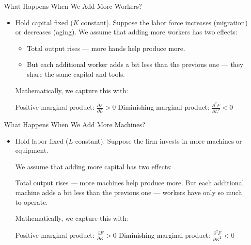 \documentclass[10pt,aspectratio=169]{beamer}
\begin{document}
\begin{frame}{What Happens When We Add More Workers?}

\begin{itemize}
    \item Hold capital fixed ($K$ constant).
    \itemvso Suppose the labor force increases (migration) or decreases (aging).
    \itemvso We assume that adding more workers has two effects:
    \begin{itemize}
        \item Total output rises — more hands help produce more. 
        \item But each additional worker adds a bit less than the previous one — they share the same capital and tools.
    \end{itemize}


    \itemvso Mathematically, we capture this with:
    \begin{itemize}
        \itemvso Positive marginal product: $\frac{\partial F}{\partial L} > 0$
        \itemvso Diminishing marginal product: $\frac{\partial^2 F}{\partial L^2} < 0$
    \end{itemize}
\end{itemize}

\end{frame}

\begin{frame}{What Happens When We Add More Machines?}

\begin{itemize}
    \item Hold labor fixed ($L$ constant).
    \itemvso Suppose the firm invests in more machines or equipment.

    \itemvso We assume that adding more capital has two effects:
    \begin{itemize}
        \itemvso Total output rises — more machines help produce more. 
        \itemvso But each additional machine adds a bit less than the previous one — workers have only so much to operate.
    \end{itemize}


    \itemvso Mathematically, we capture this with:
    \begin{itemize}
        \itemvso Positive marginal product: $\frac{\partial F}{\partial K} > 0$
        \itemvso Diminishing marginal product: $\frac{\partial^2 F}{\partial K^2} < 0$
    \end{itemize}

    \vspace{0.3cm}

\end{itemize}

\end{frame}
\end{document}
